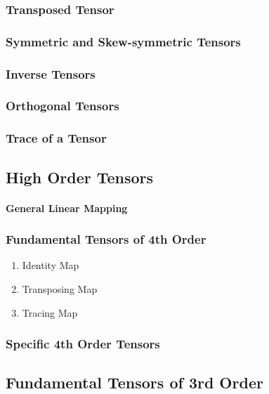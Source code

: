 \documentclass[a5paper,twosided,11pt,DIV=15,BCOR=0mm]{scrbook}
\begin{document}
\subsubsection{Transposed Tensor}
\subsubsection{Symmetric and Skew-symmetric Tensors}
\subsubsection{Inverse Tensors}
\subsubsection{Orthogonal Tensors}
\subsubsection{Trace of a Tensor}

\subsection{High Order Tensors}

\paragraph{General Linear Mapping}

\subsubsection{Fundamental Tensors of 4th Order}
\begin{boxenv}
  \begin{enumerate}
  \item Identity Map
  \item Transposing Map
  \item Tracing Map
  \end{enumerate}
\end{boxenv}
\subsubsection{Specific 4th Order Tensors}


\subsection{Fundamental Tensors of 3rd Order}
\end{document}
